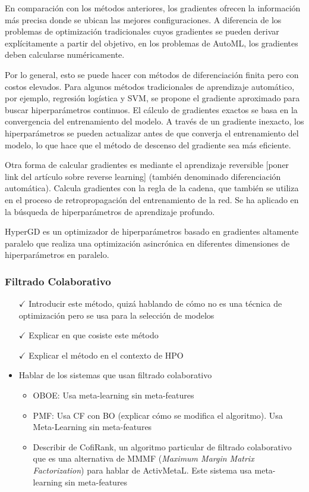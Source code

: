 En comparación con los métodos anteriores, los gradientes ofrecen la información más precisa donde se ubican las mejores configuraciones. A diferencia de los problemas de optimización tradicionales cuyos gradientes se pueden derivar explícitamente a partir del objetivo, en los problemas de AutoML, los gradientes deben calcularse numéricamente.

Por lo general, esto se puede hacer con métodos de diferenciación finita pero con costos elevados. Para algunos métodos tradicionales de aprendizaje automático, por ejemplo, regresión logística y SVM, se propone el gradiente aproximado para buscar hiperparámetros continuos. El cálculo de gradientes exactos se basa en la convergencia del entrenamiento del modelo. A través de un gradiente inexacto, los hiperparámetros se pueden actualizar antes de que converja el entrenamiento del modelo, lo que hace que el método de descenso del gradiente sea más eficiente.

Otra forma de calcular gradientes es mediante el aprendizaje reversible [poner link del artículo sobre reverse learning] (también denominado diferenciación automática). Calcula gradientes con la regla de la cadena, que también se utiliza en el proceso de retropropagación del entrenamiento de la red. Se ha aplicado en la búsqueda de hiperparámetros de aprendizaje profundo. 

HyperGD es un optimizador de hiperparámetros basado en gradientes altamente paralelo que realiza una optimización asincrónica en diferentes dimensiones de hiperparámetros en paralelo.

\subsubsection{Filtrado Colaborativo}

\begin{itemize}
	\item[$\checkmark$] Introducir este método, quizá hablando de cómo no es una técnica de optimización pero se usa para la selección de modelos
	\item[$\checkmark$] Explicar en que cosiste este método
	\item[$\checkmark$] Explicar el método en el contexto de HPO
	\item Hablar de los sistemas que usan filtrado colaborativo
	\begin{itemize}
		\item OBOE: Usa meta-learning sin meta-features
		\item PMF: Usa CF con BO (explicar cómo se modifica el algoritmo). Usa Meta-Learning sin meta-features
		\item Describir de CofiRank, un algoritmo particular de filtrado colaborativo que es una alternativa de MMMF (\textit{Maximum Margin Matrix Factorization}) para hablar de ActivMetaL. Este sistema usa meta-learning sin meta-features
	\end{itemize}
\end{itemize}

